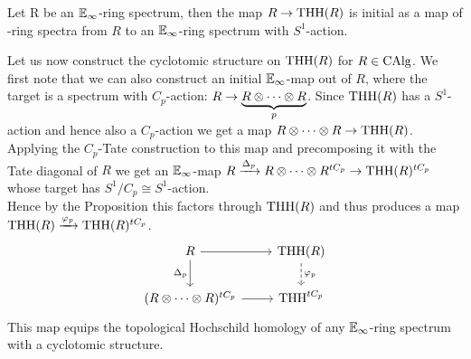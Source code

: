 \begin{prop}
Let R be an $\mathbb{E}_\infty$-ring spectrum, then the map $R\rightarrow \operatorname{THH}(R)$ is initial as a map of \Einf-ring spectra from $R$ to an $\mathbb{E}_\infty$-ring spectrum with $S^1$-action.
\end{prop}
Let us now construct the cyclotomic structure on $\operatorname{THH}(R)$ for $R\in \operatorname{CAlg}$.
We first note that we can also construct an initial $\mathbb{E}_\infty$-map out of $R$, where the target is a spectrum with $C_p$-action: $R\rightarrow \underbrace{R\otimes\dots\otimes R}_{p}$.
Since $\operatorname{THH}(R)$ has a $S^1$-action and hence also a $C_p$-action we get a map $R\otimes\dots\otimes R\rightarrow \operatorname{THH}(R)$. Applying the $C_p$-Tate construction to this map and precomposing it with the Tate diagonal of $R$ we get an $\mathbb{E}_\infty$-map $R\xrightarrow{\Delta_p} R\otimes\dots\otimes R^{tC_p}\rightarrow \operatorname{THH}(R)^{tC_p}$ whose target has $S^1/C_p\cong S^1$-action.
\\
Hence by the Proposition this factors through $\operatorname{THH}(R)$ and thus produces a map $\operatorname{THH}(R)\xrightarrow{\varphi_p} \operatorname{THH}(R)^{tC_p}$.
\[\begin{tikzcd}
	{R} & {\text{THH}(R)} \\
	{(R\otimes\dots\otimes R)^{tC_p}} & {\text{THH}^{tC_p}}
	\arrow[from=1-1, to=1-2]
	\arrow["{\varphi_p}", from=1-2, to=2-2, dashed]
	\arrow["{\Delta_p}"', from=1-1, to=2-1]
	\arrow[from=2-1, to=2-2]
\end{tikzcd}\]
This map equips the topological Hochschild homology of any $\mathbb{E}_\infty$-ring spectrum with a cyclotomic structure. 